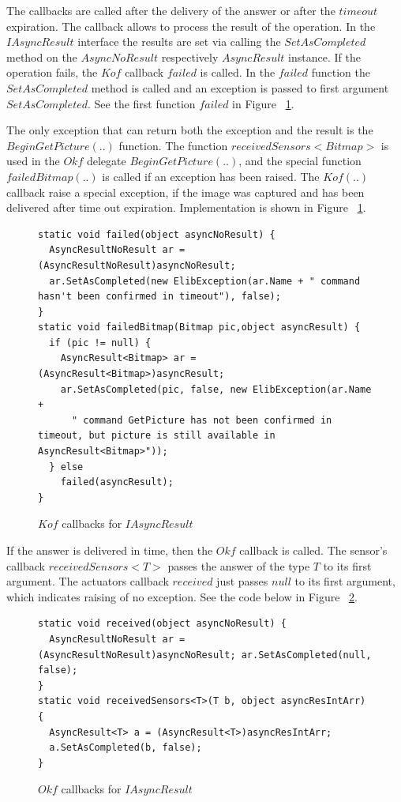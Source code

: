   The callbacks are called after the delivery of the answer or after the $timeout$ expiration.
  The callback allows to process the result of the operation.
  In the $IAsyncResult$ interface the results are set via calling the $SetAsCompleted$ method 
  on the $AsyncNoResult$ respectively $AsyncResult$ instance.
  If the operation fails, the $Kof$ callback $failed$ is called. 
  In the $failed$ function the $SetAsCompleted$ method is called and an exception is passed to first argument $SetAsCompleted$.
  See the first function $failed$ in Figure ~\ref{Ikofs}.

  The only exception that can return both the exception and the result is the $BeginGetPicture(..)$ function.
  The function $receivedSensors<Bitmap>$ is used in the $Okf$ delegate $BeginGetPicture(..)$, and 
  the special function $failedBitmap(..)$ is called if an exception has been raised.
  The $Kof(..)$ callback raise a special exception, if the image was captured and has been 
  delivered after time out expiration.
  Implementation is shown in Figure ~\ref{Ikofs}. 

  
\begin{figure}[!hbp]
\begin{lstlisting}
static void failed(object asyncNoResult) {
  AsyncResultNoResult ar = (AsyncResultNoResult)asyncNoResult;
  ar.SetAsCompleted(new ElibException(ar.Name + " command hasn't been confirmed in timeout"), false); 
}
static void failedBitmap(Bitmap pic,object asyncResult) {
  if (pic != null) {
    AsyncResult<Bitmap> ar = (AsyncResult<Bitmap>)asyncResult;        
    ar.SetAsCompleted(pic, false, new ElibException(ar.Name + 
      " command GetPicture has not been confirmed in timeout, but picture is still available in AsyncResult<Bitmap>"));
  } else
    failed(asyncResult);
}
\end{lstlisting}	
\caption{$Kof$ callbacks for $IAsyncResult$} \label{Ikofs}
\end{figure}


  If the answer is delivered in time, then the $Okf$ callback is called.
  The sensor's callback $receivedSensors<T>$ passes the answer of the type $T$ to its first argument.
  The actuators callback $received$ just passes $null$ to its first argument, which indicates
  raising of no exception.
  See the code below in Figure ~\ref{Iokfs}.


\begin{figure}[!hbp]
\begin{lstlisting}
static void received(object asyncNoResult) {
  AsyncResultNoResult ar = (AsyncResultNoResult)asyncNoResult; ar.SetAsCompleted(null, false); 
}
static void receivedSensors<T>(T b, object asyncResIntArr) {
  AsyncResult<T> a = (AsyncResult<T>)asyncResIntArr;
  a.SetAsCompleted(b, false);
}
\end{lstlisting}	
\caption{$Okf$ callbacks for $IAsyncResult$} \label{Iokfs}
\end{figure}

